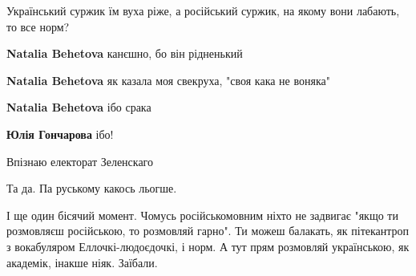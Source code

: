 \begin{itemize}
Український суржик їм вуха ріже, а російський суржик, на якому вони лабають, то все норм?

\begin{itemize}
 
\textbf{Natalia Behetova} канєшно, бо він рідненький

 
\textbf{Natalia Behetova} як казала моя свекруха, "своя кака не воняка"

 
\textbf{Natalia Behetova} ібо срака

 
\textbf{Юлія Гончарова} ібо!
\end{itemize}

 
Впізнаю електорат Зеленскаго


Та да. Па руському какось льогше.

І ще один бісячий момент. Чомусь російськомовним ніхто не задвигає "якщо ти
розмовляєш російською, то розмовляй гарно". Ти можеш балакать, як пітекантроп з
вокабуляром Еллочкі-людоєдочкі, і норм. А тут прям розмовляй українською, як
академік, інакше ніяк. Заїбали.


\end{itemize}
